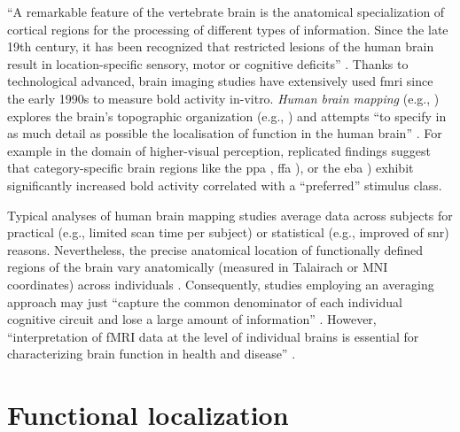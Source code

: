 
%
``A remarkable feature of the vertebrate brain is the anatomical specialization
of cortical regions for the processing of different types of information. Since
the late 19th century, it has been recognized that restricted lesions of the
human brain result in location-specific sensory, motor or cognitive deficits''
\citep{cohen1994localization}.
%
Thanks to technological advanced, brain imaging studies have extensively used
\ac{fmri} since the early 1990s to measure \ac{bold} activity in-vitro.
%
\textit{Human brain mapping} (e.g., \citep{raichle2009brief}) explores the
brain's topographic organization (e.g., \citep{eickhoff2018topographic}) and
attempts ``to specify in as much detail as possible the localisation of function
in the human brain'' \citep{savoy2001history}.
%
For example in the domain of higher-visual perception, replicated findings
suggest that category-specific brain regions like the \ac{ppa}
\citep{epstein1998ppa}, \ac{ffa} \citep{kanwisher1997ffa}), or the \ac{eba}
\citep{downing2001bodyarea}) exhibit significantly increased \ac{bold} activity
correlated with a ``preferred'' stimulus class.

%
Typical analyses of human brain mapping studies average data across subjects for
practical (e.g., limited scan time per subject) or statistical (e.g., improved
of \ac{snr}) reasons.
%
Nevertheless, the precise anatomical location of functionally defined regions of
the brain vary anatomically (measured in Talairach or MNI coordinates) across
individuals \citep{friston2006critique, saxe2006divide}.
%
Consequently, studies employing an averaging approach may just ``capture the
common denominator of each individual cognitive circuit and lose a large amount
of information'' \citep{pinel2007fast}.
%
However, ``interpretation of fMRI data at the level of individual brains is
essential for characterizing brain function in health and disease''
\citep{dubois2016building}.


\section{Functional localization}


